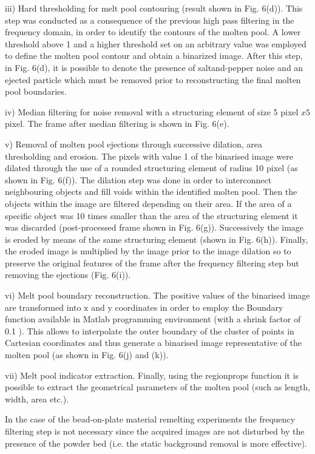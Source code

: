 \documentclass[10pt]{article}
\begin{document}
iii) Hard thresholding for melt pool contouring (result shown in Fig. 6(d)). This step was conducted as a consequence of the previous high pass filtering in the frequency domain, in order to identify the contours of the molten pool. A lower threshold above 1 and a higher threshold set on an arbitrary value was employed to define the molten pool contour and obtain a binarized image. After this step, in Fig. 6(d), it is possible to denote the presence of saltand-pepper noise and an ejected particle which must be removed prior to reconstructing the final molten pool boundaries.

iv) Median filtering for noise removal with a structuring element of size 5 pixel $x 5$ pixel. The frame after median filtering is shown in Fig. 6(e).

v) Removal of molten pool ejections through successive dilation, area thresholding and erosion. The pixels with value 1 of the binarised image were dilated through the use of a rounded structuring element of radius 10 pixel (as shown in Fig. 6(f)). The dilation step was done in order to interconnect neighbouring objects and fill voids within the identified molten pool. Then the objects within the image are filtered depending on their area. If the area of a specific object was 10 times smaller than the area of the structuring element it was discarded (post-processed frame shown in Fig. 6(g)). Successively the image is eroded by means of the same structuring element (shown in Fig. 6(h)). Finally, the eroded image is multiplied by the image prior to the image dilation so to preserve the original features of the frame after the frequency filtering step but removing the ejections (Fig. 6(i)).

vi) Melt pool boundary reconstruction. The positive values of the binarised image are transformed into $\mathrm{x}$ and $\mathrm{y}$ coordinates in order to employ the Boundary function available in Matlab programming environment (with a shrink factor of 0.1 ). This allows to interpolate the outer boundary of the cluster of points in Cartesian coordinates and thus generate a binarised image representative of the molten pool (as shown in Fig. 6(j) and (k)).

vii) Melt pool indicator extraction. Finally, using the regionprops function it is possible to extract the geometrical parameters of the molten pool (such as length, width, area etc.).

In the case of the bead-on-plate material remelting experiments the frequency filtering step is not necessary since the acquired images are not disturbed by the presence of the powder bed (i.e. the static background removal is more effective).
\end{document}
